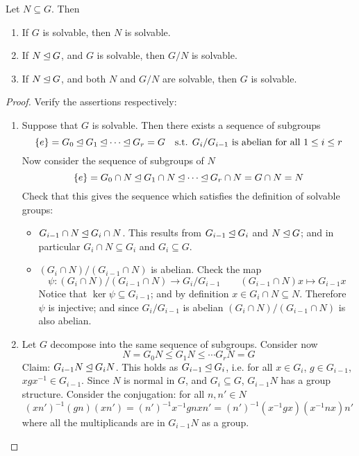 \begin{proposition}\label{prop: relations of solvability}
    Let $N \subseteq G$. Then
    \begin{enumerate}[label=\roman*)]
        \item If $G$ is solvable, then $N$ is solvable.
        \item If $N \unlhd G$, and $G$ is solvable, then $G/N$ is solvable.
        \item If $N \unlhd G$, and both $N$ and $G/N$ are solvable, then $G$ is solvable.
    \end{enumerate}
\end{proposition}

\begin{proof}
    Verify the assertions respectively:
    \begin{enumerate}[label=\roman*)]
        \item Suppose that $G$ is solvable. Then there exists a sequence of subgroups
        \[
            \{e\} = G_0 \unlhd G_1 \unlhd \cdots \unlhd G_r = G \quad \text{s.t. $G_i/G_{i-1}$ is abelian for all $1 \leq i \leq r$}
        \]
        Now consider the sequence of subgroups of $N$
        \[
            \{e\} = G_0 \cap N \unlhd G_1 \cap N \unlhd \cdots \unlhd G_r \cap N = G \cap N = N
        \]
        Check that this gives the sequence which satisfies the definition of solvable groups:
        \begin{itemize}
            \item $G_{i-1} \cap N \unlhd G_i \cap N$. This results from $G_{i-1} \unlhd G_i$ and $N \unlhd G$; and in particular $G_i \cap N \subseteq G_i$ and $G_i \subseteq G$.
            \item $(G_i \cap N)/(G_{i-1} \cap N)$ is abelian. Check the map
            \[
                \psi: (G_i \cap N)/(G_{i-1} \cap N) \to G_i/G_{i-1} \qquad (G_{i-1} \cap N) x \mapsto G_{i-1} x
            \]
            Notice that $\ker \psi \subseteq G_{i-1}$; and by definition $x \in G_i \cap N \subseteq N$. Therefore $\psi$ is injective; and since $G_i/G_{i-1}$ is abelian $(G_i \cap N)/(G_{i-1} \cap N)$ is also abelian.
        \end{itemize}
        \item Let $G$ decompose into the same sequence of subgroups. Consider now
        \[
            N = G_0 N \leq G_1 N \leq \cdots G_r N = G
        \]
        Claim: $G_{i-1} N \unlhd G_i N$. This holds as $G_{i-1} \unlhd G_i$, i.e. for all $x \in G_i$, $g \in G_{i-1}$, $xgx^{-1} \in G_{i-1}$. Since $N$ is normal in $G$, and $G_i \subseteq G$, $G_{i-1}N$ has a group structure. Consider the conjugation: for all $n, n' \in N$
        \[
            (x n')^{-1} (gn) (xn') = (n')^{-1} x^{-1} g n x n' = (n')^{-1} (x^{-1} g x) (x^{-1} n x) n'
        \]
        where all the multiplicands are in $G_{i-1}N$ as a group. 


\end{enumerate}
\end{proof}

